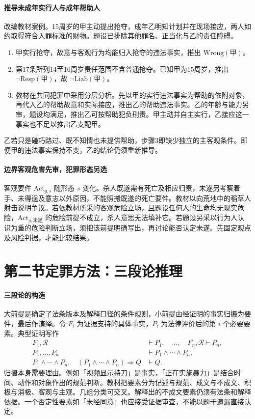 \paragraph{推导\quad 未成年实行人与成年帮助人}
改编教材案例。15周岁的甲主动提出抢夺，成年乙明知计划并在现场接应，两人如约取得符合入罪标准的财物。题设已排除其他罪名、正当化与乙的责任障碍。
\begin{enumerate}
\item 甲实行抢夺，故意与客观行为均能归入抢夺的违法事实，推出 \(\mathrm{Wrong}(\text{甲})\)。
\item 第17条所列14至16周岁责任范围不含普通抢夺。已知甲为15周岁，推出 \(\neg\mathrm{Resp}(\text{甲})\)，故 \(\neg\mathrm{Liab}(\text{甲})\)。
\item 教材在共同犯罪中采用分层分析。先以甲的实行违法事实为帮助的依附对象，再代入乙的帮助故意和实际接应，推出乙的帮助违法事实。乙的年龄与能力另审，题设均满足，推出乙可按帮助犯负刑责。甲主动并自主实行，乙接应这一事实也不足以推出乙支配甲。
\end{enumerate}
乙若只是碰巧路过、既不知情也未提供帮助，步骤3即缺少独立的主客观条件。即便甲的违法事实保持不变，乙的结论仍须重新推导。

\paragraph{边界\quad 客观危害先审，犯罪形态另选}
客观要件 \(\mathrm{Act}_{g,s}\) 随形态 \(s\) 变化。杀人既遂需有死亡及相应归责，未遂另考察着手、未得逞及意志以外原因，不能照搬既遂的死亡要件。教材以向荒地中的稻草人射击说明争议。若依教材所采的客观危险立场，且题设任何人的生命均无现实危险，\(\mathrm{Act}_{g,\text{未遂}}\) 的危险前提不成立，杀人意思无法填补它。若题设另采以行为人认识为重的危险判断立场，须把该前提明确写出，再讨论能否认定未遂。先固定观点及风险判据，才能比较结果。

\section{第二节\quad 定罪方法：三段论推理}

\paragraph{三段论的构造}
大前提是确定了法条版本及解释口径的条件规则，小前提由经证明的事实归摄为要件，最后作演绎。令 \(F_i\) 为证据支持的具体事实，\(P_i\) 为法律评价后的第 \(i\) 个必要要素。典型证明写作
\begin{align*}
 F_1,\mathcal R&\vdash P_1,\quad \ldots,\quad F_n,\mathcal R\vdash P_n,\\
 P_1,\ldots,P_n&\vdash P_1\land\cdots\land P_n,\\
 P_1\land\cdots\land P_n,\quad
 (P_1\land\cdots\land P_n)\Rightarrow Q&\vdash Q.
\end{align*}
归摄本身需要理由。例如「视频显示持刀」是事实，「正在实施暴力」是结合时间、动作和对象作出的规范判断。教材把要素分为记述与规范、成文与不成文、积极与消极、客观与主观。几组分类可交叉。解释出的不成文要素仍须有法条和解释依据。一个否定性要素如「未经同意」也应接受证据审查，不能以题干遗漏直接认定。

